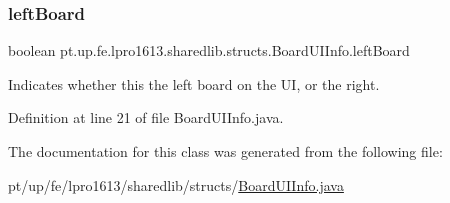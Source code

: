 \subsubsection{\texorpdfstring{left\+Board}{leftBoard}}
{\footnotesize\ttfamily boolean pt.\+up.\+fe.\+lpro1613.\+sharedlib.\+structs.\+Board\+U\+I\+Info.\+left\+Board}

Indicates whether this the left board on the UI, or the right. 

Definition at line 21 of file Board\+U\+I\+Info.\+java.



The documentation for this class was generated from the following file\+:\begin{DoxyCompactItemize}
\item 
pt/up/fe/lpro1613/sharedlib/structs/\hyperlink{_board_u_i_info_8java}{Board\+U\+I\+Info.\+java}\end{DoxyCompactItemize}
